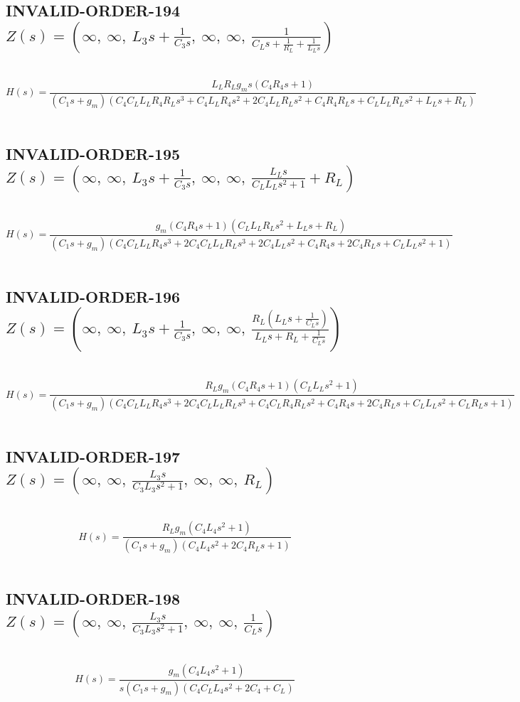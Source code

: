 \documentclass{article}
\begin{document}
\subsection{INVALID-ORDER-194 $Z(s) = \left( \infty, \  \infty, \  L_{3} s + \frac{1}{C_{3} s}, \  \infty, \  \infty, \  \frac{1}{C_{L} s + \frac{1}{R_{L}} + \frac{1}{L_{L} s}}\right)$ } \ 
\textbf{\[H(s) = \frac{L_{L} R_{L} g_{m} s \left(C_{4} R_{4} s + 1\right)}{\left(C_{1} s + g_{m}\right) \left(C_{4} C_{L} L_{L} R_{4} R_{L} s^{3} + C_{4} L_{L} R_{4} s^{2} + 2 C_{4} L_{L} R_{L} s^{2} + C_{4} R_{4} R_{L} s + C_{L} L_{L} R_{L} s^{2} + L_{L} s + R_{L}\right)}\] } \ 
\subsection{INVALID-ORDER-195 $Z(s) = \left( \infty, \  \infty, \  L_{3} s + \frac{1}{C_{3} s}, \  \infty, \  \infty, \  \frac{L_{L} s}{C_{L} L_{L} s^{2} + 1} + R_{L}\right)$ } \ 
\textbf{\[H(s) = \frac{g_{m} \left(C_{4} R_{4} s + 1\right) \left(C_{L} L_{L} R_{L} s^{2} + L_{L} s + R_{L}\right)}{\left(C_{1} s + g_{m}\right) \left(C_{4} C_{L} L_{L} R_{4} s^{3} + 2 C_{4} C_{L} L_{L} R_{L} s^{3} + 2 C_{4} L_{L} s^{2} + C_{4} R_{4} s + 2 C_{4} R_{L} s + C_{L} L_{L} s^{2} + 1\right)}\] } \ 
\subsection{INVALID-ORDER-196 $Z(s) = \left( \infty, \  \infty, \  L_{3} s + \frac{1}{C_{3} s}, \  \infty, \  \infty, \  \frac{R_{L} \left(L_{L} s + \frac{1}{C_{L} s}\right)}{L_{L} s + R_{L} + \frac{1}{C_{L} s}}\right)$ } \ 
\textbf{\[H(s) = \frac{R_{L} g_{m} \left(C_{4} R_{4} s + 1\right) \left(C_{L} L_{L} s^{2} + 1\right)}{\left(C_{1} s + g_{m}\right) \left(C_{4} C_{L} L_{L} R_{4} s^{3} + 2 C_{4} C_{L} L_{L} R_{L} s^{3} + C_{4} C_{L} R_{4} R_{L} s^{2} + C_{4} R_{4} s + 2 C_{4} R_{L} s + C_{L} L_{L} s^{2} + C_{L} R_{L} s + 1\right)}\] } \ 
\subsection{INVALID-ORDER-197 $Z(s) = \left( \infty, \  \infty, \  \frac{L_{3} s}{C_{3} L_{3} s^{2} + 1}, \  \infty, \  \infty, \  R_{L}\right)$ } \ 
\textbf{\[H(s) = \frac{R_{L} g_{m} \left(C_{4} L_{4} s^{2} + 1\right)}{\left(C_{1} s + g_{m}\right) \left(C_{4} L_{4} s^{2} + 2 C_{4} R_{L} s + 1\right)}\] } \ 
\subsection{INVALID-ORDER-198 $Z(s) = \left( \infty, \  \infty, \  \frac{L_{3} s}{C_{3} L_{3} s^{2} + 1}, \  \infty, \  \infty, \  \frac{1}{C_{L} s}\right)$ } \ 
\textbf{\[H(s) = \frac{g_{m} \left(C_{4} L_{4} s^{2} + 1\right)}{s \left(C_{1} s + g_{m}\right) \left(C_{4} C_{L} L_{4} s^{2} + 2 C_{4} + C_{L}\right)}\] } \ 
\end{document}
